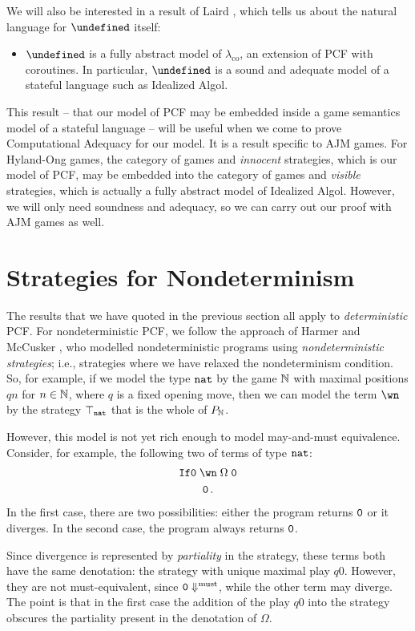 \documentclass[sigplan,10pt,review]{acmart}\settopmatter{printfolios=true,printccs=false,printacmref=false}
\let\G\undefined
\begin{document}
We will also be interested in a result of Laird \cite{LairdCofCommCom}, which tells us about the natural language for $\G$ itself:
\begin{itemize}
  \item $\G$ is a fully abstract model of $\lambda_{\text{co}}$, an extension of PCF with coroutines.
    In particular, $\G$ is a sound and adequate model of a stateful language such as Idealized Algol.
\end{itemize}

This result -- that our model of PCF may be embedded inside a game semantics model of a stateful language -- will be useful when we come to prove Computational Adequacy for our model.  
It is a result specific to AJM games.  
For Hyland-Ong games, the category of games and \emph{innocent} strategies, which is our model of PCF, may be embedded into the category of games and \emph{visible} strategies, which is actually a fully abstract model of Idealized Algol.  
However, we will only need soundness and adequacy, so we can carry out our proof with AJM games as well.

\section{Strategies for Nondeterminism}

The results that we have quoted in the previous section all apply to \emph{deterministic} PCF.  
For nondeterministic PCF, we follow the approach of Harmer and McCusker \cite{mcCHFiniteND}, who modelled nondeterministic programs using \emph{nondeterministic strategies}; i.e., strategies where we have relaxed the nondeterminism condition.  
So, for example, if we model the type ${\mathtt{nat}}$ by the game $\mathbb{N}$ with maximal positions $qn$ for $n\in\mathbb{N}$, where $q$ is a fixed opening move, then we can model the term $\wn$ by the strategy $\top_{\mathtt{nat}}$ that is the whole of $P_{\mathbb{N}}$.  

However, this model is not yet rich enough to model may-and-must equivalence.  
Consider, for example, the following two of terms of type ${\mathtt{nat}}$:
\begin{gather*}
  \IfO \wn\;\Omega\;\0 \\
  \0\,.
\end{gather*}
In the first case, there are two possibilities: either the program returns ${\mathtt{0}}$ or it diverges.
In the second case, the program always returns ${\mathtt{0}}$.  

Since divergence is represented by \emph{partiality} in the strategy, these terms both have the same denotation: the strategy with unique maximal play $q0$.  
However, they are not must-equivalent, since ${\mathtt{0}}\Downarrow^{\text{must}}$, while the other term may diverge.  
The point is that in the first case the addition of the play $q0$ into the strategy obscures the partiality present in the denotation of $\Omega$.
\end{document}
